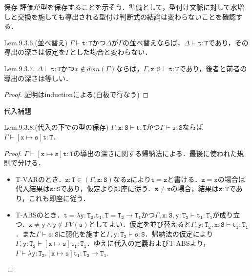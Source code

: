 \documentclass[9pt]{beamer}
\begin{document}
\begin{frame}{保存}
評価が型を保存することを示そう．準備として，型付け文脈に対して水増しと交換を施しても導出される型付け判断式の結論は変わらないことを確認する．
\begin{alertblock}{Lem.9.3.6.(並べ替え)}
$\Gamma\vdash\mathtt{t:T}$かつ$\Delta$が$\Gamma$の並べ替えならば，$\Delta\vdash\mathtt{t:T}$であり，その導出の深さは仮定を$\Gamma$とした場合と変わらない．
\end{alertblock}
\begin{alertblock}{Lem.9.3.7.}
$\Delta\vdash \mathtt{t:T}$かつ$x\notin\mathrel{dom}(\Gamma)$ならば，$\Gamma,\mathtt{x:S\vdash t:T}$であり，後者と前者の導出の深さは等しい．
\end{alertblock}
\begin{proof}
証明はinductionによる(白板で行なう)
\end{proof}
\end{frame}
\begin{frame}{代入補題}
\begin{alertblock}{Lem.9.3.8.(代入の下での型の保存)}
$\Gamma,\mathtt{x:S\vdash t:T}$かつ$\Gamma\vdash\mathtt{s:S}$ならば$\Gamma\vdash\mathtt{\left[x\mapsto s\right] t:T}$．
\end{alertblock}
\begin{proof}
$\Gamma\vdash\mathtt{\left[x\mapsto s\right] t:T}$の導出の深さに関する帰納法による．最後に使われた規則で分ける．
\begin{itemize}
\item $\mathrm{T}$-$\mathrm{VAR}$のとき．$\mathtt{z:T}\in\left(\Gamma, \mathtt{x:S}\right)$なる$\mathtt{z}$により$\mathtt{t = z}$と書ける．$\mathtt{z = x}$の場合は代入結果は$\mathtt{s:S}$であり，仮定より即座に従う．$\mathtt{z\neq x}$の場合，結果は$\mathtt{z:T}$であり，これも即座に従う．
\item $\mathrm{T}$-$\mathrm{ABS}$のとき．$\mathtt{t= \lambda y:T_{2}.t_{1}, T = T_{2}\rightarrow T_{1} }$かつ$\Gamma,\mathtt{x:S, y:T_{2}\vdash t_{1}:T_{1}}$が成り立つ．$\mathtt{x \neq y}\land \mathtt{y}\notin\mathrel{FV}(\mathtt{s})$としてよい．仮定を並び替えると$\Gamma, \mathtt{y:T_{2}, x:S\vdash t_{1}:T_{1}}$．また$\Gamma\vdash \mathtt{s:S}$に弱化を施すと$\Gamma, \mathtt{\mathtt{y:T_{2}\vdash s:S}}$．帰納法の仮定により$\Gamma, \mathtt{y:T_{2}\vdash\left[x\mapsto s\right]t_{1}:T_{1}}$．ゆえに代入の定義および$\mathrm{T}$-$\mathrm{ABS}$より，$\Gamma\vdash\mathtt{\lambda y:T_{2}.\left[x\mapsto s\right]t_{1}:T_{2}\rightarrow T_{1}}$.
\end{itemize}
\end{proof}
\end{frame}
\end{document}

